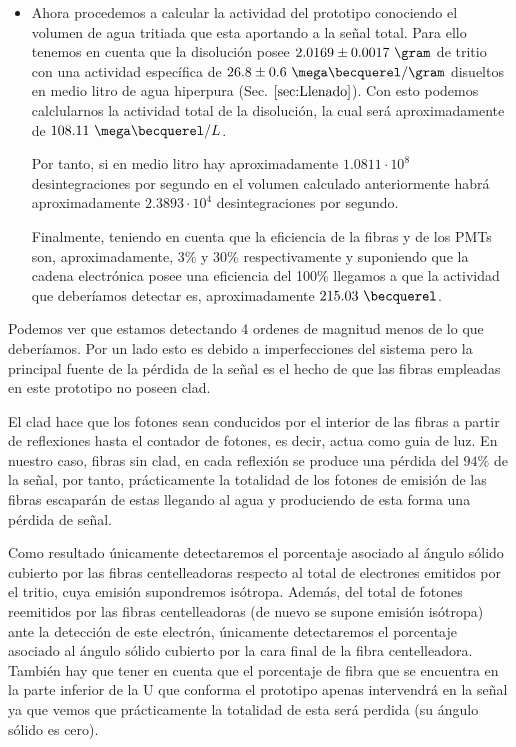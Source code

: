 \begin{itemize}
\item{} Ahora procedemos a calcular la actividad del prototipo conociendo el volumen de agua tritiada que esta aportando a la señal total. Para ello tenemos en cuenta que la disolución posee $2.0169 \pm 0.0017~\gram$ de tritio con una actividad específica de $26.8 \pm 0.6~\mega\becquerel/\gram$ disueltos en medio litro de agua hiperpura (Sec. $\ref{sec:Llenado}$). Con esto podemos calclularnos la actividad total de la disolución, la cual será aproximadamente de $108.11~\mega\becquerel/L$. 

Por tanto, si en medio litro hay aproximadamente $1.0811\cdotp 10^{8}$ desintegraciones por segundo en el volumen calculado anteriormente habrá aproximadamente $2.3893\cdotp 10^{4}$ desintegraciones por segundo.

Finalmente, teniendo en cuenta que la eficiencia de la fibras y de los PMTs son, aproximadamente, 3\% y 30\% respectivamente y suponiendo que la cadena electrónica posee una eficiencia del 100\% llegamos a que la actividad que deberíamos detectar es, aproximadamente $215.03~\becquerel$.

\end{itemize}

Podemos ver que estamos detectando 4 ordenes de magnitud menos de lo que deberíamos. Por un lado esto es debido a imperfecciones del sistema pero la principal fuente de la pérdida de la señal es el hecho de que las fibras empleadas en este prototipo no poseen clad. 

El clad hace que los fotones sean conducidos por el interior de las fibras a partir de reflexiones hasta el contador de fotones, es decir, actua como guia de luz. En nuestro caso, fibras sin clad, en cada reflexión se produce una pérdida del $94\%$ de la señal, por tanto, prácticamente la totalidad de los fotones de emisión de las fibras escaparán de estas llegando al agua y produciendo de esta forma una pérdida de señal. 

Como resultado únicamente detectaremos el porcentaje asociado al ángulo sólido cubierto por las fibras centelleadoras respecto al total de electrones emitidos por el tritio, cuya emisión supondremos isótropa. Además, del total de fotones reemitidos por las fibras centelleadoras (de nuevo se supone emisión isótropa) ante la detección de este electrón, únicamente detectaremos el porcentaje asociado al ángulo sólido cubierto por la cara final de la fibra centelleadora. También hay que tener en cuenta que el porcentaje de fibra que se encuentra en la parte inferior de la U que conforma el prototipo apenas intervendrá en la señal ya que vemos que prácticamente la totalidad de esta será perdida (su ángulo sólido es cero). 

